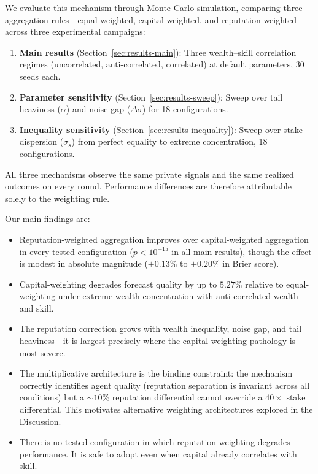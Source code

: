 \documentclass[conference]{IEEEtran}
\begin{document}
We evaluate this mechanism through Monte Carlo simulation, comparing three aggregation rules---equal-weighted, capital-weighted, and reputation-weighted---across three experimental campaigns:
\begin{enumerate}
    \item \textbf{Main results} (Section~\ref{sec:results-main}): Three wealth--skill correlation regimes (uncorrelated, anti-correlated, correlated) at default parameters, 30 seeds each.
    \item \textbf{Parameter sensitivity} (Section~\ref{sec:results-sweep}): Sweep over tail heaviness ($\alpha$) and noise gap ($\Delta\sigma$) for 18 configurations.
    \item \textbf{Inequality sensitivity} (Section~\ref{sec:results-inequality}): Sweep over stake dispersion ($\sigma_s$) from perfect equality to extreme concentration, 18 configurations.
\end{enumerate}
All three mechanisms observe the same private signals and the same realized outcomes on every round. Performance differences are therefore attributable solely to the weighting rule.

Our main findings are:
\begin{itemize}
    \item Reputation-weighted aggregation improves over capital-weighted aggregation in every tested configuration ($p < 10^{-15}$ in all main results), though the effect is modest in absolute magnitude ($+0.13\%$ to $+0.20\%$ in Brier score).
    \item Capital-weighting degrades forecast quality by up to $5.27\%$ relative to equal-weighting under extreme wealth concentration with anti-correlated wealth and skill.
    \item The reputation correction grows with wealth inequality, noise gap, and tail heaviness---it is largest precisely where the capital-weighting pathology is most severe.
    \item The multiplicative architecture is the binding constraint: the mechanism correctly identifies agent quality (reputation separation is invariant across all conditions) but a ${\sim}10\%$ reputation differential cannot override a $40\times$ stake differential. This motivates alternative weighting architectures explored in the Discussion.
    \item There is no tested configuration in which reputation-weighting degrades performance. It is safe to adopt even when capital already correlates with skill.
\end{itemize}
\end{document}
